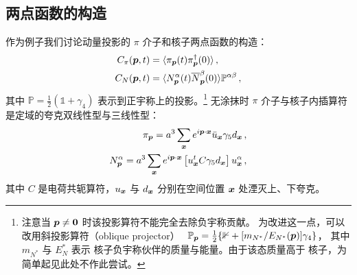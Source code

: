 \subsection{两点函数的构造}
作为例子我们讨论动量投影的
$\pi$ 介子和核子两点函数的构造：
\begin{align}
C_{\pi}(\boldsymbol{p},t)
&=\langle \pi_{\boldsymbol{p}} (t) \pi^{\dagger}_{\boldsymbol{p}} (0)\rangle\,,\nonumber\\
C_{N}(\boldsymbol{p},t)&=
\langle N_{\boldsymbol{p}}^{\alpha} (t) \overline{N}_{\boldsymbol{p}}^{\beta}(0)\rangle \mathbb{P}^{\alpha\beta}\,,
  \label{interpol}
\end{align}
其中 $\mathbb{P}=\frac{1}{2}(\mathds{1}+\gamma_4)$ 表示到正宇称上的投影。\footnote{注意当 $\boldsymbol{p}\neq\boldsymbol{0}$
时该投影算符不能完全去除负宇称贡献。
为改进这一点，可以改用斜投影算符（oblique projector）~\cite{Lee:1998cx}
$\mathbb{P}_{\boldsymbol{p}}=\frac{1}{2}\{\mathbb{1}+[m_{N^*}/E_{N^*}(\boldsymbol{p})]\gamma_4\}$，
其中 $m_{N^*}$ 与 $E_N^*$ 表示
核子负宇称伙伴的质量与能量。由于该态质量高于
核子，为简单起见此处不作此尝试。}
无涂抹时 $\pi$ 介子与核子内插算符
是定域的夸克双线性型与三线性型：
\begin{align}
\pi_{\boldsymbol{p}}= a^3\sum_{\boldsymbol{x}}e^{i\boldsymbol{p}\cdot\boldsymbol{x}} \bar{u}_{\boldsymbol{x}}\gamma_5 d_{\boldsymbol{x}}\,,\\
N^{\alpha}_{\boldsymbol{p}} = a^3\sum_{\boldsymbol{x}} e^{i\boldsymbol{p}\cdot\boldsymbol{x}} \left[ u^t_{\boldsymbol{x}} C \gamma_5 d_{\boldsymbol{x}} \right]u^{\alpha}_{\boldsymbol{x}}\,,
\end{align}
其中 $C$ 是电荷共轭算符，$u_{\boldsymbol{x}}$ 与
$d_{\boldsymbol{x}}$ 分别在空间位置 $\boldsymbol{x}$ 处湮灭上、下夸克。

